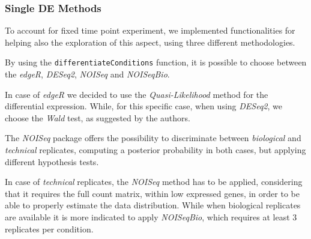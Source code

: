 %


\subsubsection{Single DE Methods}

To account for fixed time point experiment, we implemented functionalities for helping also the exploration of this aspect, using three different methodologies.
 

By using the \lstinline!differentiateConditions! function, it is possible to choose between the \textit{edgeR}, \textit{DESeq2}, \textit{NOISeq} and \textit{NOISeqBio}.

In case of \textit{edgeR} we decided to use the \textit{Quasi-Likelihood} method for the differential expression.
While, for this specific case, when using \textit{DESeq2}, we choose the \textit{Wald} test, as suggested by the authors.

The \textit{NOISeq} package offers the possibility to discriminate between \textit{biological} and \textit{technical} replicates, computing a posterior probability in both cases, but applying different hypothesis tests.

In case of \textit{technical} replicates, the \textit{NOISeq} method has to be applied, considering that it requires the full count matrix, within low expressed genes, in order to be able to properly estimate the data distribution.
While when biological replicates are available it is more indicated to apply \textit{NOISeqBio}, which requires at least 3 replicates per condition.



